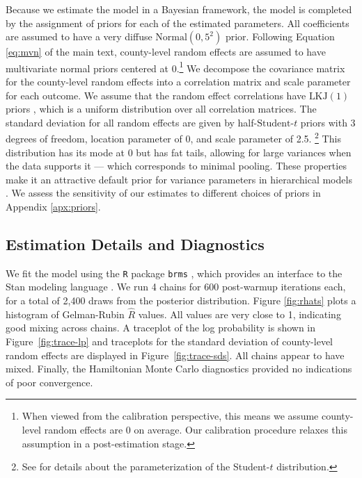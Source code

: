 Because we estimate the model in a Bayesian framework, the model is completed by the assignment of priors for each of the estimated parameters. 
All coefficients are assumed to have a very diffuse $\text{Normal}(0,5^2)$ prior.
Following Equation \ref{eq:mvn} of the main text, county-level random effects are assumed to have multivariate normal priors centered at 0.\footnote{When viewed from the calibration perspective, this means we assume county-level random effects are 0 on average. Our calibration procedure relaxes this assumption in a post-estimation stage.}
We decompose the covariance matrix for the county-level random effects into a correlation matrix and scale parameter for each outcome. 
We assume that the random effect correlations have $\text{LKJ}(1)$ priors \citep{Lewandowski2009}, which is a uniform distribution over all correlation matrices. 
The standard deviation for all random effects are given by half-$\text{Student-}t$ priors with 3 degrees of freedom, location parameter of 0, and scale parameter of 2.5. \footnote{See \citet{StanReference} for details about the parameterization of the Student-$t$ distribution.} 
This distribution has its mode at 0 but has fat tails, allowing for large variances when the data supports it --- which corresponds to minimal pooling. 
These properties make it an attractive default prior for variance parameters in hierarchical models \citep{Gelman2006}.
We assess the sensitivity of our estimates to different choices of priors in Appendix \ref{apx:priors}.


\subsection{Estimation Details and Diagnostics}

We fit the model using the \texttt{R} package \texttt{brms} \citep{Buerkner2017}, which provides an interface to the Stan modeling language \citep{Carpenter2017}.
We run 4 chains for 600 post-warmup iterations each, for a total of 2,400 draws from the posterior distribution. 
Figure \ref{fig:rhats} plots a histogram of Gelman-Rubin $\hat{R}$ values. 
All values are very close to 1, indicating good mixing across chains.
A traceplot of the log probability is shown in Figure~\ref{fig:trace-lp} and traceplots for the standard deviation of county-level random effects are displayed in Figure~\ref{fig:trace-sds}.
All chains appear to have mixed.
Finally, the Hamiltonian Monte Carlo diagnostics \citep{Betancourt2016} provided no indications of poor convergence.

